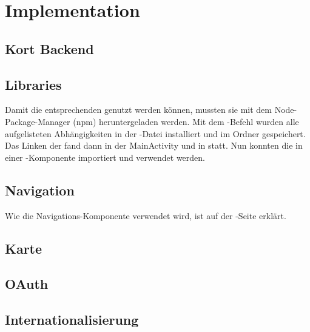 \chapter{Implementation}
\label{pd-implementation}

\section{Kort Backend}


\section{Libraries}
Damit die entsprechenden  genutzt werden können, mussten sie mit dem Node-Package-Manager (npm) heruntergeladen werden. 
Mit dem -Befehl wurden alle aufgelisteten Abhängigkeiten in der  -Datei installiert und im Ordner  gespeichert.
Das Linken der  fand dann in der MainActivity und in  statt. 
Nun konnten die  in einer -Komponente importiert und verwendet werden. 


\section{Navigation}
Wie die Navigations-Komponente verwendet wird, ist auf der -Seite erklärt. 



\section{Karte}


\section{OAuth}


\section{Internationalisierung}

